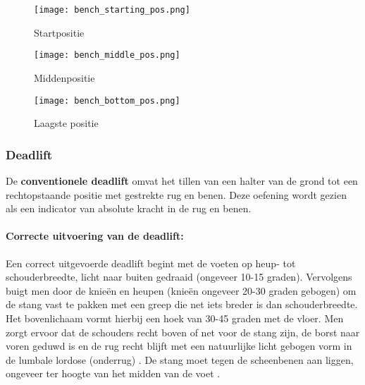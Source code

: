 \begin{figure}[h]
  \centering
  \begin{minipage}[t]{0.32\textwidth}
    \centering
    \texttt{[image: bench\_starting\_pos.png]}
    \caption[Figuur 1]{\label{fig:bench_startpositie} Startpositie \autocite{Ronai2018}}
  \end{minipage}
  \hfill
  \begin{minipage}[t]{0.32\textwidth}
    \centering
    \texttt{[image: bench\_middle\_pos.png]}
    \caption[Figuur 2]{\label{fig:bench_middenpositie} Middenpositie \autocite{Ronai2018}}
  \end{minipage}
  \hfill
  \begin{minipage}[t]{0.32\textwidth}
    \centering
    \texttt{[image: bench\_bottom\_pos.png]}
    \caption[Figuur 3]{\label{fig:bench_onderpositie} Laagste positie \autocite{Ronai2018}}
  \end{minipage}
\end{figure}

\subsubsection{Deadlift}
\label{subsubsec:deadlift}
De \textbf{conventionele deadlift} omvat het tillen van een halter van de grond tot een rechtopstaande positie met gestrekte rug en benen. 
Deze oefening wordt gezien als een indicator van absolute kracht in de rug en benen.

\paragraph{Correcte uitvoering van de deadlift:}
Een correct uitgevoerde deadlift begint met de voeten op heup- tot schouderbreedte, licht naar buiten gedraaid (ongeveer 10-15 graden). 
Vervolgens buigt men door de knieën en heupen (knieën ongeveer 20-30 graden gebogen) om de stang vast te pakken met een greep die net iets breder is dan schouderbreedte. 
Het bovenlichaam vormt hierbij een hoek van 30-45 graden met de vloer. 
Men zorgt ervoor dat de schouders recht boven of net voor de stang zijn, de borst naar voren geduwd is en de rug recht blijft met een natuurlijke licht gebogen vorm in de lumbale lordose (onderrug) \autocite{BirdEtAl2010}. 
De stang moet tegen de scheenbenen aan liggen, ongeveer ter hoogte van het midden van de voet \autocite{Ronai2020}.

